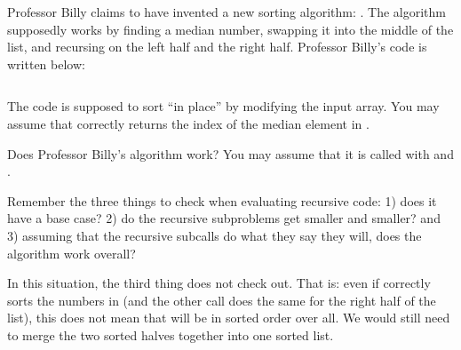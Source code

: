 \begin{prob}
    Professor Billy claims to have invented a new sorting algorithm:
    . The algorithm supposedly works by finding a median
    number, swapping it into the middle of the list, and recursing on the left
    half and the right half. Professor Billy's code is written below:

    \inputminted[lastline=18]{python}{\thisdir/code.py}

    The code is supposed to sort ``in place'' by modifying the input array.
    You may assume that  correctly returns the index
    of the median element in .

    Does Professor Billy's  algorithm work? You may assume that it is called
    with  and .



    \begin{soln}
        Remember the three things to check when evaluating recursive code: 1)
        does it have a base case? 2) do the recursive subproblems get smaller
        and smaller? and 3) assuming that the recursive subcalls do what they say
        they will, does the algorithm work overall?

        In this situation, the third thing does not check out. That is: even if
         correctly sorts the numbers
        in  (and the other call does the same for
        the right half of the list), this does not mean that  will
        be in sorted order over all. We would still need to merge the two
        sorted halves together into one sorted list.


\end{soln}
\end{prob}
